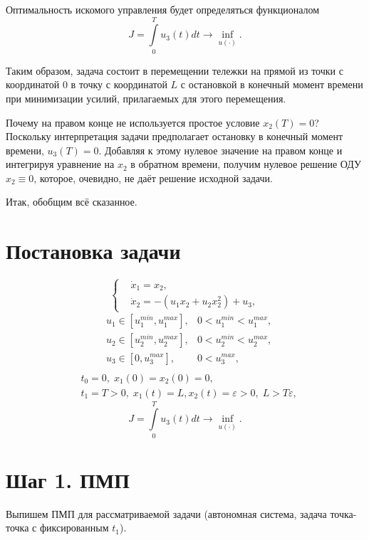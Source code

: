 Оптимальность искомого управления будет определяться функционалом
$$
J = \int\limits_{0}^{T} u_3(t) dt \to \inf\limits_{u(\cdot)}.
$$

Таким образом, задача состоит в перемещении тележки на прямой из точки с координатой $0$ в точку с координатой $L$ с остановкой в конечный момент времени при минимизации усилий, прилагаемых для этого перемещения.

\begin{remark}
    Почему на правом конце не используется простое условие $x_2(T) = 0$? Поскольку интерпретация задачи предполагает остановку в конечный момент времени, $u_3(T) = 0$. Добавляя к этому нулевое значение на правом конце и интегрируя уравнение на $x_2$ в обратном времени, получим нулевое решение ОДУ $x_2 \equiv 0$, которое, очевидно, не даёт решение исходной задачи.
\end{remark}

Итак, обобщим всё сказанное.

\section*{Постановка задачи}
$$
    \left\{
            \begin{aligned}
                & \dot{x}_1 = x_2, \\
                & \dot{x}_2 = - (u_1x_2 + u_2 x_2^2) + u_3,
            \end{aligned}
        \right.
$$
$$
    \begin{aligned}
        & u_1 \in [u_1^{min}, u_1^{max}], & 0 < u_1^{min} < u_1^{max}, \\
        & u_2 \in [u_2^{min}, u_2^{max}], & 0 < u_2^{min} < u_2^{max}, \\
        & u_3 \in [0, u_3^{max}],         & 0 < u_3^{max}, \\
    \end{aligned}
$$
$$
    \begin{aligned}
        & t_0 = 0, \; x_1 (0) = x_2 (0) = 0, \\
        & t_1 = T > 0, \; x_1(t) = L, x_2(t) = \varepsilon > 0, \; L > T \varepsilon,
    \end{aligned}
$$
$$
J = \int\limits_{0}^{T} u_3(t) dt \to \inf\limits_{u(\cdot)}.
$$

\section*{Шаг 1. ПМП}
Выпишем ПМП для рассматриваемой задачи (автономная система, задача точка-точка с фиксированным $t_1$).

